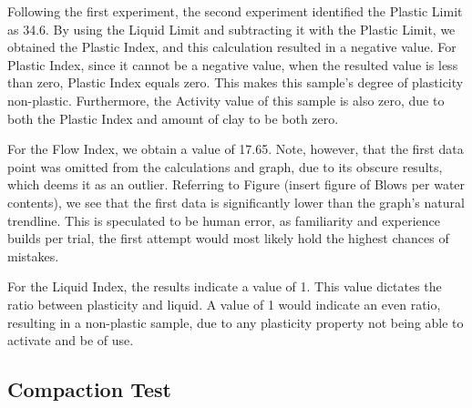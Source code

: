 \documentclass{article}
\begin{document}
\par Following the first experiment, the second experiment identified the Plastic Limit as 34.6. By using the Liquid Limit and subtracting it with the Plastic Limit, we obtained the Plastic Index, and this calculation resulted in a negative value. For Plastic Index, since it cannot be a negative value, when the resulted value is less than zero, Plastic Index equals zero. This makes this sample's degree of plasticity non-plastic. Furthermore, the Activity value of this sample is also zero, due to both the Plastic Index and amount of clay to be both zero.  
\par For the Flow Index, we obtain a value of 17.65. Note, however, that the first data point was omitted from the calculations and graph, due to its obscure results, which deems it as an outlier. Referring to Figure (insert figure of Blows per water contents), we see that the first data is significantly lower than the graph's natural trendline. This is speculated to be human error, as familiarity and experience builds per trial, the first attempt would most likely hold the highest chances of mistakes.  
\par For the Liquid Index, the results indicate a value of 1. This value dictates the ratio between plasticity and liquid. A value of 1 would indicate an even ratio, resulting in a non-plastic sample, due to any plasticity property not being able to activate and be of use.
\newpage
\subsection{Compaction Test}
\end{document}
